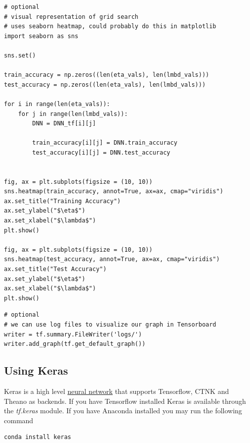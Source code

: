 \documentclass[%
oneside,                 %
final,                   %
10pt]{article}
\begin{document}
\begin{verbatim}
# optional
# visual representation of grid search
# uses seaborn heatmap, could probably do this in matplotlib
import seaborn as sns

sns.set()

train_accuracy = np.zeros((len(eta_vals), len(lmbd_vals)))
test_accuracy = np.zeros((len(eta_vals), len(lmbd_vals)))

for i in range(len(eta_vals)):
    for j in range(len(lmbd_vals)):
        DNN = DNN_tf[i][j]

        train_accuracy[i][j] = DNN.train_accuracy
        test_accuracy[i][j] = DNN.test_accuracy

        
fig, ax = plt.subplots(figsize = (10, 10))
sns.heatmap(train_accuracy, annot=True, ax=ax, cmap="viridis")
ax.set_title("Training Accuracy")
ax.set_ylabel("$\eta$")
ax.set_xlabel("$\lambda$")
plt.show()

fig, ax = plt.subplots(figsize = (10, 10))
sns.heatmap(test_accuracy, annot=True, ax=ax, cmap="viridis")
ax.set_title("Test Accuracy")
ax.set_ylabel("$\eta$")
ax.set_xlabel("$\lambda$")
plt.show()
\end{verbatim}

\begin{verbatim}
# optional
# we can use log files to visualize our graph in Tensorboard
writer = tf.summary.FileWriter('logs/')
writer.add_graph(tf.get_default_graph())
\end{verbatim}


\subsection*{Using Keras}

Keras is a high level \href{{https://en.wikipedia.org/wiki/Application_programming_interface}}{neural network}
that supports Tensorflow, CTNK and Theano as backends.  
If you have Tensorflow installed Keras is available through the \emph{tf.keras} module.  
If you have Anaconda installed you may run the following command
\begin{verbatim}
conda install keras
\end{verbatim}
\end{document}
